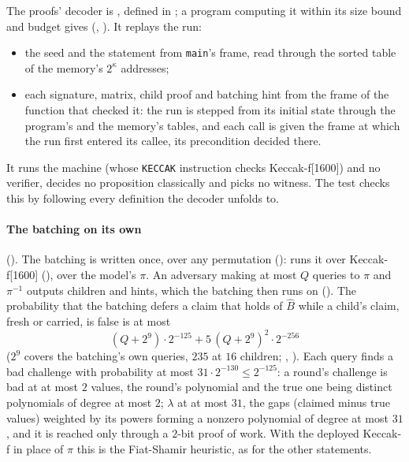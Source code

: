 \documentclass[11pt]{article}
\begin{document}
The proofs' decoder is , defined in ; a program
computing it within its size bound and budget gives 
(, ). It replays the run:
\begin{itemize}
\item the seed and the statement from \texttt{main}'s frame, read through the sorted table of the
memory's $2^\kappa$ addresses;
\item each signature, matrix, child proof and batching hint from the frame of the function that
checked it: the run is stepped from its initial state through the program's and the memory's
tables, and each call is given the frame at which the run first entered its callee, its
precondition decided there.
\end{itemize}
It runs the machine (whose \texttt{KECCAK} instruction checks Keccak-f[1600]) and no verifier,
decides no proposition classically and picks no witness. The test
 checks this by following every definition the decoder
unfolds to.

\paragraph{The batching on its own} (). The batching is written once, over any permutation ():  runs it over Keccak-f[1600] (),  over the model's $\pi$. An adversary making at most $Q$ queries to $\pi$ and $\pi^{-1}$ outputs children and hints, which the batching then runs on (). The probability that the batching defers a claim that holds of $\widehat{B}$ while a child's claim, fresh or carried, is false is at most
\[
\boxed{\ (Q + 2^9)\cdot 2^{-125} + 5\,(Q+2^9)^2\cdot 2^{-256}\ }
\]
($2^9$ covers the batching's own queries, $235$ at $16$ children; , ). Each query finds a bad challenge with probability at most $31 \cdot 2^{-130} \le 2^{-125}$: a round's challenge is bad at at most $2$ values, the round's polynomial and the true one being distinct polynomials of degree at most $2$; $\lambda$ at at most $31$, the gaps (claimed minus true values) weighted by its powers forming a nonzero polynomial of degree at most $31$, and it is reached only through a $2$-bit proof of work. With the deployed Keccak-f in place of $\pi$ this is the Fiat-Shamir heuristic, as for the other statements.
\end{document}
